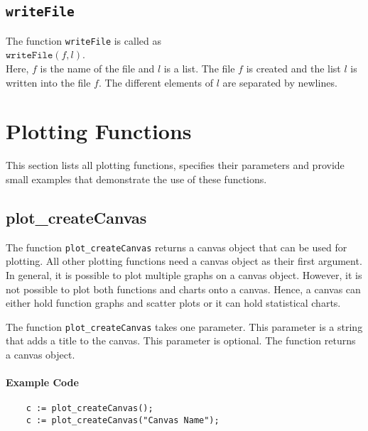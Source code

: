\subsection{\texttt{writeFile}}
The function \texttt{writeFile}  is called as
\\[0.2cm]
\hspace*{1.3cm}
$\mathtt{writeFile}(f, l)$.
\\[0.2cm]
Here, $f$ is the name of the file and $l$ is a list.  The file $f$ is created and the list
$l$ is written into the file $f$.  The different elements of $l$ are separated by newlines.


\section{Plotting Functions}
This section lists all plotting functions, specifies their parameters and provide small examples
that demonstrate the use of these functions.
 

\subsection{plot\_createCanvas} 
The function \texttt{plot\_createCanvas} returns a canvas object that can be used for plotting.
All other plotting functions need a canvas object as their first argument.  In general, it is
possible to plot multiple graphs on a canvas object.  However, it is not possible to plot both
functions and charts onto a canvas.  Hence, a canvas can either hold function graphs and scatter
plots or it can hold statistical charts.

The function \texttt{plot\_createCanvas} takes one parameter.  This parameter is a string that adds
a title to the canvas. This parameter is optional.  The function returns a canvas object.

\paragraph{Example Code}
\begin{verbatim}
    c := plot_createCanvas();
    c := plot_createCanvas("Canvas Name");
\end{verbatim}

